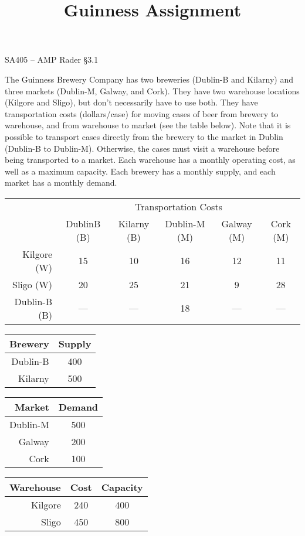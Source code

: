 \documentclass[11pt]{article}
\makeatletter
\theoremstyle{definition}
\renewcommand{\maketitle}{
  \noindent SA405 -- AMP \hfill Rader \S 3.1 \\

  \begin{center}\Large{\textbf{\@title}}\end{center}
}
\makeatother
\begin{document}
  
\title{Guinness Assignment}

\maketitle


The Guinness Brewery Company has two breweries (Dublin-B and Kilarny) and three markets (Dublin-M, Galway, and Cork).   They have two warehouse locations (Kilgore and Sligo), but don't necessarily have to use both.  They have transportation costs (dollars/case) for moving cases of beer from brewery to warehouse, and from warehouse to market (see the table below).  Note that it is possible to transport cases directly from the brewery to the market in Dublin (Dublin-B to Dublin-M).  Otherwise, the cases must visit a warehouse before being transported to a market.  Each warehouse has a monthly operating cost, as well as a maximum capacity.  Each brewery has a monthly supply, and each market has a monthly demand.


\begin{center}
\begin{tabular}{r|ccccc}
& \multicolumn{5}{c}{Transportation Costs} \\
& DublinB (B) & Kilarny (B) & Dublin-M (M) & Galway (M) & Cork (M) \\
\hline
Kilgore (W) & 15 & 10 & 16 & 12 & 11  \\
Sligo (W) &  20 & 25 & 21 & 9 & 28  \\
Dublin-B (B) &  --- & --- & 18 & --- & --- \\
\hline
\end{tabular}
\end{center}


\begin{tabular}{r|c}
Brewery & Supply \\
\hline
Dublin-B & 400 \\
Kilarny & 500 \\
\end{tabular}
\hspace{1cm}
\begin{tabular}{r|c}
Market & Demand \\
\hline
Dublin-M & 500 \\
Galway & 200 \\
Cork & 100 \\
\end{tabular}
\hspace{1cm}
\begin{tabular}{r|cc}
Warehouse & Cost & Capacity \\
\hline
Kilgore & 240 & 400 \\
Sligo & 450 & 800 \\
\end{tabular}
\end{document}
